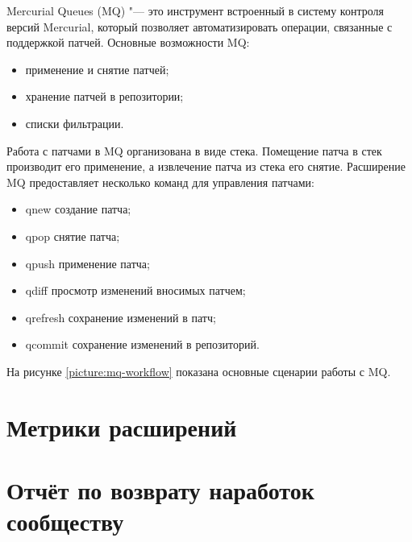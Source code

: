 Mercurial Queues (MQ) "--- это инструмент встроенный в систему контроля версий
Mercurial, который позволяет автоматизировать операции, связанные с поддержкой
патчей. Основные возможности MQ:
\begin{itemize}
  \item применение и снятие патчей;
  \item хранение патчей в репозитории;
  \item списки фильтрации.
\end{itemize}
Работа с патчами в MQ организована в виде стека. Помещение патча в стек
производит его применение, а извлечение патча из стека его снятие. Расширение
MQ предоставляет несколько команд для управления патчами:
\begin{itemize}
  \item qnew создание патча;
  \item qpop снятие патча;
  \item qpush применение патча;
  \item qdiff просмотр изменений вносимых патчем;
  \item qrefresh сохранение изменений в патч;
  \item qcommit сохранение изменений в репозиторий.
\end{itemize}


На рисунке \ref{picture:mq-workflow} показана основные сценарии работы с MQ. 


\section{Метрики расширений}
\section{Отчёт по возврату наработок сообществу}


